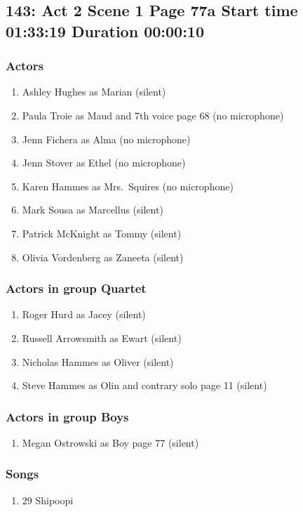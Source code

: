 \subsection{143: Act 2 Scene 1 Page 77a Start time 01:33:19 Duration 00:00:10}

\subsubsection{Actors}
\begin{enumerate}
\item Ashley Hughes as Marian (silent)
\item Paula Troie as Maud and 7th voice page 68 (no microphone)
\item Jenn Fichera as Alma (no microphone)
\item Jenn Stover as Ethel (no microphone)
\item Karen Hammes as Mrs.~Squires (no microphone)
\item Mark Sousa as Marcellus (silent)
\item Patrick McKnight as Tommy (silent)
\item Olivia Vordenberg as Zaneeta (silent)
\end{enumerate}
\subsubsection{Actors in group Quartet}
\begin{enumerate}
\item Roger Hurd as Jacey (silent)
\item Russell Arrowsmith as Ewart (silent)
\item Nicholas Hammes as Oliver (silent)
\item Steve Hammes as Olin and contrary solo page 11 (silent)
\end{enumerate}
\subsubsection{Actors in group Boys}
\begin{enumerate}
\item Megan Ostrowski as Boy page 77 (silent)
\end{enumerate}

\subsubsection{Songs}
\begin{enumerate}
\item 29 Shipoopi
\end{enumerate}
